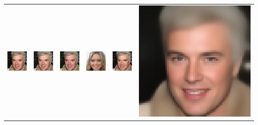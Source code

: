 \begin{table}[h!]
{\begin{tabular}{cccccc}
        \includegraphics[width=.15\textwidth]{chapter4/figures/images/celebA/original/8.png} &   
        \includegraphics[width=.15\textwidth]{chapter4/figures/images/celebA/reconstruction/8.png} &
        \includegraphics[width=.15\textwidth]{chapter4/figures/images/celebA/corrected_reconstruction/8.png} &
        \includegraphics[width=.15\textwidth]{chapter4/figures/images/celebA/diffusion_decoder_beta_0.01/8.png} &
        \includegraphics[width=.15\textwidth]{chapter4/figures/images/celebA/diffusion_decoder_beta_0/8.png} &
        \includegraphics[width=.15\textwidth]{chapter4/figures/images/celebA/VAE_reconstruction/8.png} \\
 

\end{tabular}}
\end{table}
